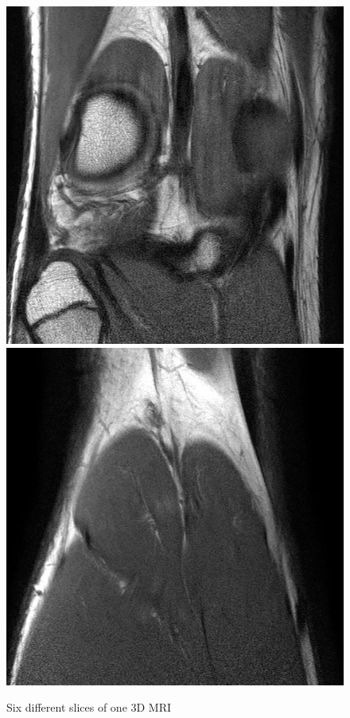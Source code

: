 \begin{figure}[H]
\endminipage\hfill
{}
  \includegraphics[width=\linewidth]{imgs/31.jpg}
\endminipage\hfill
{}%
  \includegraphics[width=\linewidth]{imgs/38.jpg}
\endminipage
\caption{Six different slices of one 3D MRI}
\end{figure}

